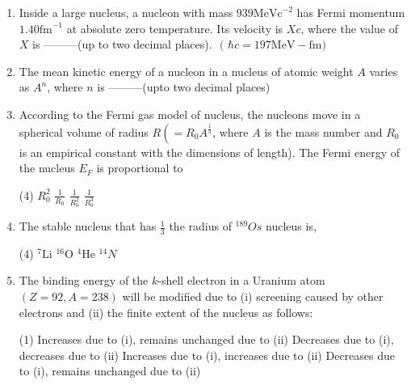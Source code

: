 \begin{enumerate}
	\item  Inside a large nucleus, a nucleon with mass $939 \mathrm{MeVc}^{-2}$ has Fermi momentum $1.40 \mathrm{fm}^{-1}$ at absolute zero temperature. Its velocity is $X c$, where the value of $X$ is ---------(up to two decimal places).
	$
	\text { ( } \hbar c=197 \mathrm{MeV}-\mathrm{fm})
	$
\item  The mean kinetic energy of a nucleon in a nucleus of atomic weight $A$ varies as $A^n$, where $n$ is ---------(upto two decimal places)
	\item  According to the Fermi gas model of nucleus, the nucleons move in a spherical volume of radius $R\left(=R_0 A^{\frac{1}{3}}\right.$, where $A$ is the mass number and $R_0$ is an empirical constant with the dimensions of length). The Fermi energy of the nucleus $E_F$ is proportional to
	 \begin{tasks}(4)
		\task[\textbf{a.}]$R_0^2$
		\task[\textbf{b.}]$\frac{1}{R_0}$
		\task[\textbf{c.}]$\frac{1}{R_0^2}$
		\task[\textbf{d.}] $\frac{1}{R_0^3}$
	\end{tasks}


\item  The stable nucleus that has $\frac{1}{3}$ the radius of ${ }^{189} O s$ nucleus is,
 \begin{tasks}(4)
	\task[\textbf{a.}]${ }^7 \mathrm{Li}$
	\task[\textbf{b.}] ${ }^{16} \mathrm{O}$
	\task[\textbf{c.}]${ }^4 \mathrm{He}$
	\task[\textbf{d.}] ${ }^{14} N$
\end{tasks}
\item  The binding energy of the $k$-shell electron in a Uranium atom $(Z=92, A=238)$ will be modified due to (i) screening caused by other electrons and (ii) the finite extent of the nucleus as follows:
 \begin{tasks}(1)
	\task[\textbf{a.}]Increases due to (i), remains unchanged due to (ii)
	\task[\textbf{b.}]Decreases due to (i), decreases due to (ii)
	\task[\textbf{c.}]Increases due to (i), increases due to (ii)
	\task[\textbf{d.}] Decreases due to (i), remains unchanged due to (ii)
\end{tasks}
\end{enumerate}
\setlength\arrayrulewidth{1pt}

